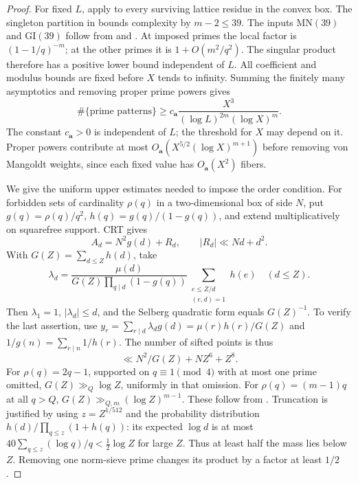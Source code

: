 \begin{proof}
For fixed $L$, apply \cite[Main Theorem, p.~1763]{greentao} to every
surviving lattice residue in the convex box. The singleton partition
in \cite[Definition~1.5 and Lemma~1.6]{greentao} bounds complexity by
$m-2\le39$. The inputs $\mathrm{MN}(39)$ and $\mathrm{GI}(39)$ follow
from \cite[Theorem~1.1]{moebius} and \cite[Theorem~1.3]{gtz}.
At imposed primes the local factor is $(1-1/q)^{-m}$; at the other
primes it is $1+O(m^2/q^2)$. The singular product therefore has a
positive lower bound independent of $L$. All coefficient and modulus
bounds are fixed before $X$ tends to infinity. Summing the finitely
many asymptotics and removing proper prime powers gives
\begin{equation}\label{eq:old41-lower}
 \#\{\text{prime patterns}\}\ge
 c_{\mathbf a}\frac{X^3}{(\log L)^{2m}(\log X)^m}.
\end{equation}
The constant $c_{\mathbf a}>0$ is independent of $L$; the threshold
for $X$ may depend on it. Proper powers contribute at most
$O_{\mathbf a}(X^{5/2}(\log X)^{m+1})$ before removing von Mangoldt
weights, since each fixed value has $O_{\mathbf a}(X^2)$ fibers.

We give the uniform upper estimates needed to impose the order condition.
For forbidden sets of cardinality $\rho(q)$ in a two-dimensional box
of side $N$, put $g(q)=\rho(q)/q^2$, $h(q)=g(q)/(1-g(q))$, and extend
multiplicatively on squarefree support. CRT gives
\[
 A_d=N^2g(d)+R_d,\qquad |R_d|\ll Nd+d^2.
\]
With $G(Z)=\sum_{d\le Z}h(d)$, take
\[
 \lambda_d=\frac{\mu(d)}{G(Z)\prod_{q\mid d}(1-g(q))}
 \sum_{\substack{e\le Z/d\\(e,d)=1}}h(e)\quad(d\le Z).
\]
Then $\lambda_1=1$, $|\lambda_d|\le d$, and the Selberg quadratic
form equals $G(Z)^{-1}$. To verify the last assertion, use
$y_r=\sum_{r\mid d}\lambda_dg(d)=\mu(r)h(r)/G(Z)$ and
$1/g(n)=\sum_{r\mid n}1/h(r)$. The number of sifted points is thus
\begin{equation}\label{eq:old41-upper}
 \ll N^2/G(Z)+NZ^6+Z^8.
\end{equation}
For $\rho(q)=2q-1$, supported on $q\equiv1\pmod4$ with at most one
prime omitted, $G(Z)\gg_Q\log Z$, uniformly in that omission.
For $\rho(q)=(m-1)q$ at all $q>Q$,
$G(Z)\gg_{Q,m}(\log Z)^{m-1}$. These follow from
\cite[Theorem~1, moduli~4 and~2]{williams-mertens}. Truncation is
justified by using $z=Z^{1/512}$ and the probability distribution
$h(d)/\prod_{q\le z}(1+h(q))$: its expected $\log d$ is at most
$40\sum_{q\le z}(\log q)/q<\tfrac12\log Z$ for large $Z$.
Thus at least half the mass lies below $Z$. Removing one norm-sieve
prime changes its product by a factor at least $1/2$.


\end{proof}
